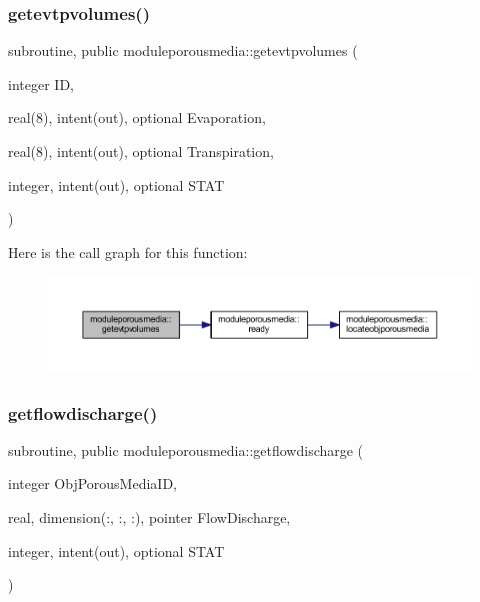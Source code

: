 \subsubsection{\texorpdfstring{getevtpvolumes()}{getevtpvolumes()}}
{\footnotesize\ttfamily subroutine, public moduleporousmedia\+::getevtpvolumes (\begin{DoxyParamCaption}\item[{integer}]{ID,  }\item[{real(8), intent(out), optional}]{Evaporation,  }\item[{real(8), intent(out), optional}]{Transpiration,  }\item[{integer, intent(out), optional}]{S\+T\+AT }\end{DoxyParamCaption})}

Here is the call graph for this function\+:\nopagebreak
\begin{figure}[H]
\begin{center}
\leavevmode
\includegraphics[width=350pt]{namespacemoduleporousmedia_ac5c8b09a721ba8f3b2b3610d90098651_cgraph}
\end{center}
\end{figure}
\mbox{\label{namespacemoduleporousmedia_a26ca2f410bb96e145f78213b45a7a519}} 
\subsubsection{\texorpdfstring{getflowdischarge()}{getflowdischarge()}}
{\footnotesize\ttfamily subroutine, public moduleporousmedia\+::getflowdischarge (\begin{DoxyParamCaption}\item[{integer}]{Obj\+Porous\+Media\+ID,  }\item[{real, dimension(\+:, \+:, \+:), pointer}]{Flow\+Discharge,  }\item[{integer, intent(out), optional}]{S\+T\+AT }\end{DoxyParamCaption})}


